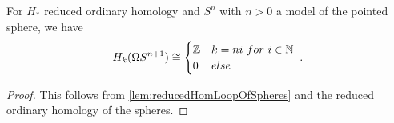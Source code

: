 \begin{corollary}
    For $H_*$ reduced ordinary homology and $S^n$ with $n>0$ a model of the pointed sphere, we have
    \begin{equation*}
        H_k(\Omega S^{n+1})\cong
        \begin{cases}
            \mathbb{Z} & k=ni ~for~ i\in\mathbb{N}\\
            0 & else
        \end{cases}\;.
    \end{equation*}
    \begin{proof}
        This follows from \cref{lem:reducedHomLoopOfSpheres} and the reduced ordinary homology of the spheres.
    \end{proof}
\end{corollary}
